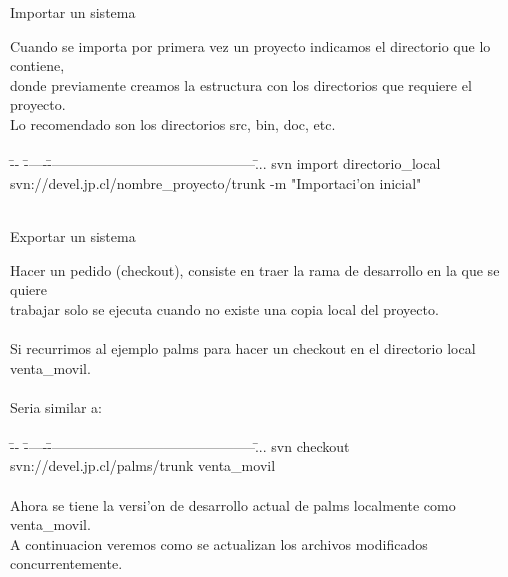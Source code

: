 \documentclass[xcolor=dvipsnames]{beamer}
\begin{document}
	\begin{frame}{Importar un sistema}
	\scriptsize
	{
	\begin{tabbing}
	Cuando se importa por primera vez un proyecto indicamos el directorio que lo contiene, \\
	donde previamente creamos la estructura con los directorios que requiere el proyecto. \\
	Lo recomendado son los directorios \scriptsize{\color{Blue}src, bin, doc}, etc. \\ \\
	\= -- \= -----\= ---------------------------------------------\=  ... \kill
	\>\> svn import \scriptsize{\color{Blue}directorio\_local} svn://devel.jp.cl/\scriptsize{\color{Blue}nombre\_proyecto}/trunk -m "\scriptsize{\color{Blue}Importaci'on inicial}"	\\ \\
	
	
	\end{tabbing}
	}
	\end{frame}

	\begin{frame}{Exportar un sistema}
	\scriptsize
	{
	\begin{tabbing}
	Hacer un pedido (\scriptsize{\color{Blue}checkout}), consiste en traer la rama de desarrollo en la que se quiere \\
	trabajar solo se ejecuta cuando no existe una copia local del proyecto. \\ \\
	
	Si recurrimos al ejemplo \scriptsize{\color{Blue}palms} para hacer un checkout en el directorio local \scriptsize{\color{Blue}venta\_movil}.  \\ \\
	Seria similar a: \\ \\
	\= -- \= -----\= ---------------------------------------------\=  ... \kill
	\>\> svn checkout svn://devel.jp.cl/palms/trunk \scriptsize{\color{Blue}venta\_movil}	\\ \\
	
	Ahora se tiene la versi'on de desarrollo actual de palms localmente como venta\_movil. \\
	A continuacion veremos como se actualizan los archivos modificados concurrentemente.\\
	\end{tabbing}
	}
	\end{frame}
	
\end{document}
